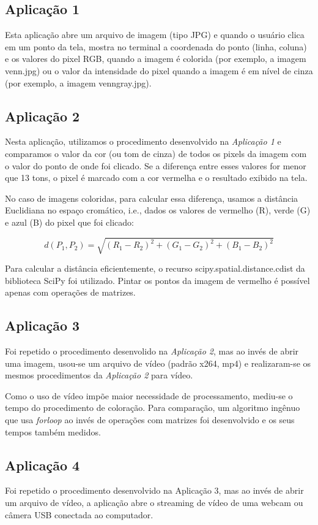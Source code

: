 \documentclass[conference]{IEEEtran}
\begin{document}
\subsection*{Aplicação 1}
Esta aplicação abre um arquivo de imagem (tipo JPG) e quando o usuário clica em um ponto da tela, mostra no terminal a coordenada do ponto (linha, coluna) e os valores do pixel RGB, quando a imagem é colorida (por exemplo, a imagem venn.jpg) ou o valor da intensidade do pixel quando a imagem é em nível de cinza (por exemplo, a imagem venngray.jpg).
\subsection*{Aplicação 2}
Nesta aplicação, utilizamos o procedimento desenvolvido na \textit{Aplicação 1} e comparamos o valor da cor (ou tom de cinza) de todos os pixels da imagem com o valor do ponto de onde foi clicado. Se a diferença entre esses valores for menor que 13 tons, o pixel é marcado com a cor vermelha e o resultado exibido na tela. 

No caso de imagens coloridas, para calcular essa diferença, usamos a distância Euclidiana no espaço cromático, i.e., dados os valores de vermelho (R), verde (G) e azul (B) do pixel que foi clicado:

\[d(P_{1},P_2) = \sqrt{(R_1-R_2)^2+(G_1-G_2)^2+(B_1-B_2)^2}\]

Para calcular a distância eficientemente, o recurso scipy.spatial.distance.cdist da biblioteca SciPy foi utilizado.  Pintar os pontos da imagem de vermelho é possível apenas com operações de matrizes.

\subsection*{Aplicação 3}

Foi repetido o procedimento desenvolido na \textit{Aplicação 2}, mas ao invés de abrir uma imagem, usou-se um arquivo de vídeo (padrão x264, mp4) e realizaram-se os mesmos procedimentos da \textit{Aplicação 2} para vídeo.

Como o uso de vídeo impõe maior necessidade de processamento, mediu-se o tempo do procedimento de coloração.  Para comparação, um algoritmo ingênuo que usa \textit{forloop} ao invés de operações com matrizes foi desenvolvido e os seus tempos também medidos.

\subsection*{Aplicação 4}
Foi repetido o procedimento desenvolvido na Aplicação 3, mas ao invés de abrir um arquivo de vídeo, a aplicação abre o streaming de vídeo de uma webcam ou câmera USB conectada ao computador.
\end{document}
